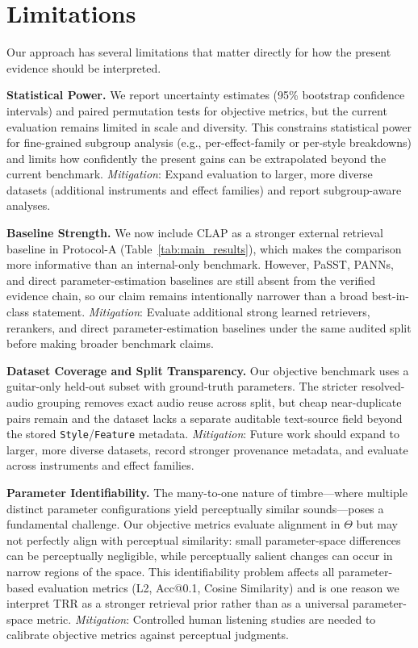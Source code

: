\section{Limitations}
\label{sec:limitations}

Our approach has several limitations that matter directly for how the present evidence should be interpreted.

\textbf{Statistical Power.}
We report uncertainty estimates (95\% bootstrap confidence intervals) and paired permutation tests for objective metrics, but the current evaluation remains limited in scale and diversity. This constrains statistical power for fine-grained subgroup analysis (e.g., per-effect-family or per-style breakdowns) and limits how confidently the present gains can be extrapolated beyond the current benchmark.
\textit{Mitigation}: Expand evaluation to larger, more diverse datasets (additional instruments and effect families) and report subgroup-aware analyses.

\textbf{Baseline Strength.}
We now include CLAP as a stronger external retrieval baseline in Protocol-A (Table~\ref{tab:main_results}), which makes the comparison more informative than an internal-only benchmark. However, PaSST, PANNs, and direct parameter-estimation baselines are still absent from the verified evidence chain, so our claim remains intentionally narrower than a broad best-in-class statement.
\textit{Mitigation}: Evaluate additional strong learned retrievers, rerankers, and direct parameter-estimation baselines under the same audited split before making broader benchmark claims.

\textbf{Dataset Coverage and Split Transparency.} Our objective benchmark uses a guitar-only held-out subset with ground-truth parameters. The stricter resolved-audio grouping removes exact audio reuse across split, but cheap near-duplicate pairs remain and the dataset lacks a separate auditable text-source field beyond the stored \texttt{Style}/\texttt{Feature} metadata. \textit{Mitigation}: Future work should expand to larger, more diverse datasets, record stronger provenance metadata, and evaluate across instruments and effect families.

\textbf{Parameter Identifiability.} The many-to-one nature of timbre---where multiple distinct parameter configurations yield perceptually similar sounds---poses a fundamental challenge. Our objective metrics evaluate alignment in $\Theta$ but may not perfectly align with perceptual similarity: small parameter-space differences can be perceptually negligible, while perceptually salient changes can occur in narrow regions of the space. This identifiability problem affects all parameter-based evaluation metrics (L2, Acc@0.1, Cosine Similarity) and is one reason we interpret TRR as a stronger retrieval prior rather than as a universal parameter-space metric. \textit{Mitigation}: Controlled human listening studies are needed to calibrate objective metrics against perceptual judgments.

